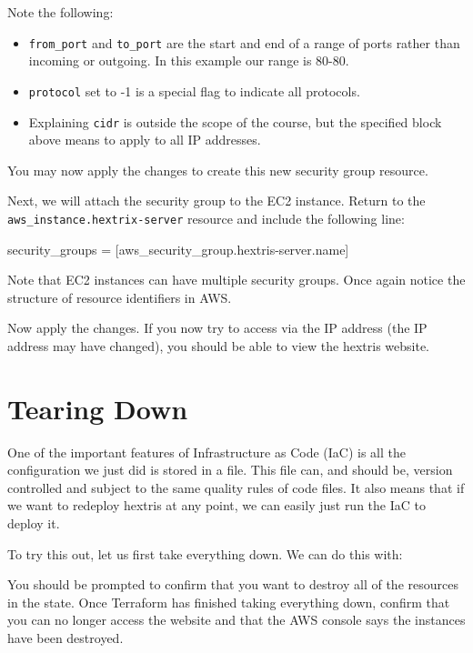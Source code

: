 \documentclass{csse4400}
\begin{document}
Note the following:
\begin{itemize}
  \item \texttt{from\_port} and \texttt{to\_port} are the start and end of a range of ports rather than incoming or outgoing. In this example our range is 80-80.
  \item \texttt{protocol} set to -1 is a special flag to indicate all protocols.
  \item Explaining \texttt{cidr} is outside the scope of the course, but the specified block above means to apply to all IP addresses.
\end{itemize}

You may now apply the changes to create this new security group resource.

Next, we will attach the security group to the EC2 instance.
Return to the \texttt{aws\_instance.hextrix-server} resource
and include the following line:

\begin{code}[language=terraform]{}
security_groups = [aws_security_group.hextris-server.name]
\end{code}

Note that EC2 instances can have multiple security groups.
Once again notice the structure of resource identifiers in AWS.


Now apply the changes.
If you now try to access via the IP address
(the IP address may have changed),
you should be able to view the hextris website.

\section{Tearing Down}

One of the important features of Infrastructure as Code (IaC) is all the configuration we just did is stored in a file.
This file can, and should be, version controlled and subject to the same quality rules of code files.
It also means that if we want to redeploy hextris at any point,
we can easily just run the IaC to deploy it.

To try this out, let us first take everything down.
We can do this with:

You should be prompted to confirm that you want to destroy all of the resources in the state.
Once Terraform has finished taking everything down,
confirm that you can no longer access the website and that the AWS console says the instances have been destroyed.
\end{document}
